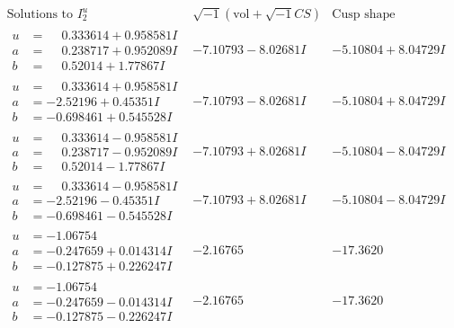 \documentclass[1p]{elsarticle_modified}
\theoremstyle{definition}
\newcommand{\I}{\sqrt{-1}}
\begin{document}
$$\begin{array}{c|c|c}  
\text{Solutions to }I^u_{2}& \I (\text{vol} + \sqrt{-1}CS) & \text{Cusp shape}\\
 \hline 
\begin{aligned}
u &= \phantom{-}0.333614 + 0.958581 I \\
a &= \phantom{-}0.238717 + 0.952089 I \\
b &= \phantom{-}0.52014 + 1.77867 I\end{aligned}
 & -7.10793 - 8.02681 I & -5.10804 + 8.04729 I \\ \hline\begin{aligned}
u &= \phantom{-}0.333614 + 0.958581 I \\
a &= -2.52196 + 0.45351 I \\
b &= -0.698461 + 0.545528 I\end{aligned}
 & -7.10793 - 8.02681 I & -5.10804 + 8.04729 I \\ \hline\begin{aligned}
u &= \phantom{-}0.333614 - 0.958581 I \\
a &= \phantom{-}0.238717 - 0.952089 I \\
b &= \phantom{-}0.52014 - 1.77867 I\end{aligned}
 & -7.10793 + 8.02681 I & -5.10804 - 8.04729 I \\ \hline\begin{aligned}
u &= \phantom{-}0.333614 - 0.958581 I \\
a &= -2.52196 - 0.45351 I \\
b &= -0.698461 - 0.545528 I\end{aligned}
 & -7.10793 + 8.02681 I & -5.10804 - 8.04729 I \\ \hline\begin{aligned}
u &= -1.06754\phantom{ +0.000000I} \\
a &= -0.247659 + 0.014314 I \\
b &= -0.127875 + 0.226247 I\end{aligned}
 & -2.16765\phantom{ +0.000000I} & -17.3620\phantom{ +0.000000I} \\ \hline\begin{aligned}
u &= -1.06754\phantom{ +0.000000I} \\
a &= -0.247659 - 0.014314 I \\
b &= -0.127875 - 0.226247 I\end{aligned}
 & -2.16765\phantom{ +0.000000I} & -17.3620\phantom{ +0.000000I} \\ \hline\begin{aligned}

\end{aligned}
\end{array}$$
\end{document}
